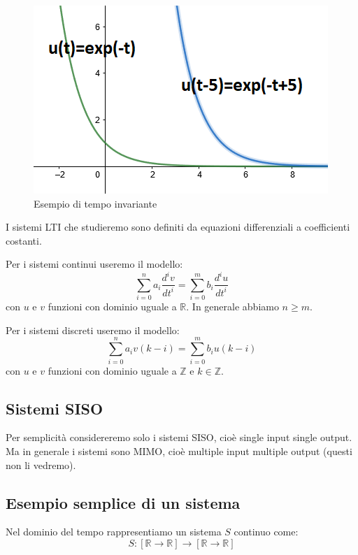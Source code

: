 \begin{figure}[h]
	\centering
	\includegraphics[width=0.7\linewidth]{immagini/esponenziale}
	\caption{ Esempio di tempo invariante }
	\label{fig:esponenziale}
\end{figure}

\pagebreak

I sistemi LTI che studieremo sono definiti da equazioni differenziali a coefficienti costanti.

Per i sistemi continui useremo il modello:
\begin{equation*}
\sum\limits_{i=0}^n a_{i} \frac{ d^{i} v }{ dt^{i}  } = \sum\limits_{i=0}^m b_{i} \frac{ d^{i} u }{ dt^{i}  }
\tag{1}\label{equation 1}
\end{equation*}
con $u$ e $v$ funzioni con dominio uguale a $\mathbb{R}$. In generale abbiamo $n\geq m$.


Per i sistemi discreti useremo il modello:
\begin{equation*}
\sum\limits_{i=0}^n a_{i} v(k-i) = \sum\limits_{i=0}^m b_{i} u(k-i)
\end{equation*}
con $u$ e $v$ funzioni con dominio uguale a $\mathbb{Z}$ e $ k \in \mathbb{Z} $.

\subsection*{Sistemi SISO}
Per semplicità considereremo solo i sistemi SISO, cioè single input single output. Ma in generale i sistemi sono MIMO, cioè multiple input multiple output (questi non li vedremo).

\subsection*{Esempio semplice di un sistema}

Nel dominio del tempo rappresentiamo un sistema $S$ continuo come: \\
\begin{equation*}
S: [\mathbb{R} \rightarrow \mathbb{R}] \rightarrow [\mathbb{R} \rightarrow \mathbb{R}]
\end{equation*}

